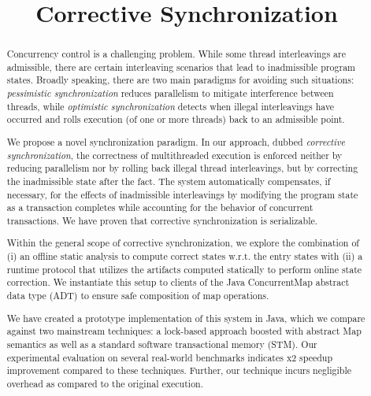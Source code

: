 \documentclass[preprint,nocopyrightspace,pldi]{sigplanconf-pldi16}
\theoremstyle{exampstyle}\newtheorem{theorem}{Theorem}[section]
\theoremstyle{exampstyle}\newtheorem{lemma}[theorem]{Lemma}
\theoremstyle{exampstyle}\newtheorem{proposition}[theorem]{Proposition}
\theoremstyle{exampstyle}\newtheorem{corollary}[theorem]{Corollary}
\theoremstyle{exampstyle}\newtheorem{definition}{Definition}[section]
\theoremstyle{exampstyle}\newtheorem{parameter}{Parameter}[section]
\theoremstyle{exampstyle}\newtheorem{property}{Property}[section]
\theoremstyle{exampstyle}\newtheorem{example}[equation]{Example}
\theoremstyle{exampstyle}\newtheorem{algorithm}[theorem]{Algorithm}
\begin{document}
\title{Corrective Synchronization\vspace{-3.25cm}}



\authorinfo{}{}{}
\maketitle

\begin{abstract}
Concurrency control is a challenging problem. While some thread interleavings are admissible, there are certain interleaving scenarios that lead to inadmissible program states. Broadly speaking, there are two main paradigms for avoiding such situations: \emph{pessimistic synchronization} reduces parallelism to mitigate interference between threads, while \emph{optimistic synchronization} detects when illegal interleavings have occurred and rolls execution (of one or more threads) back to an admissible point.

We propose a novel synchronization paradigm. In our approach, dubbed \emph{corrective synchronization}, the correctness of multithreaded execution is enforced neither by reducing parallelism nor by rolling back illegal thread interleavings, but by correcting the inadmissible state after the fact. The system automatically compensates, if necessary, for the effects of inadmissible interleavings by modifying the program state as a transaction completes while accounting for the behavior of concurrent transactions. We have proven that corrective synchronization is serializable.

Within the general scope of corrective synchronization, we explore the combination of (i) an offline static analysis to compute correct states w.r.t. the entry states with (ii) a runtime protocol that utilizes the artifacts computed statically to perform online state correction. We instantiate this setup to clients of the Java {\sf ConcurrentMap} abstract data type (ADT) to ensure safe composition of map operations.

We have created a prototype implementation of this system in Java, which we compare against two mainstream techniques: a lock-based approach boosted with abstract {\sf Map} semantics as well as a standard software transactional memory (STM). Our experimental evaluation on several real-world benchmarks indicates x2 speedup improvement compared to these techniques. Further, our technique incurs negligible overhead as compared to the original execution.
\end{abstract}
\end{document}
